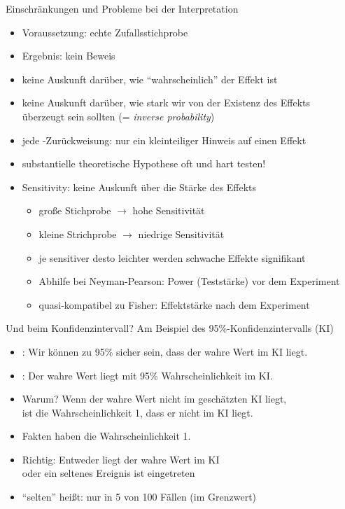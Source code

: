 \begin{frame}
  {Einschränkungen und Probleme bei der Interpretation}
  \begin{itemize}
    \item Voraussetzung: \alert{echte Zufallsstichprobe}
    \item Ergebnis: \alert{kein Beweis}
    \item keine Auskunft darüber, wie "`wahrscheinlich"' der Effekt ist
    \item keine Auskunft darüber, wie stark wir von der Existenz des Effekts\\
      überzeugt sein sollten (= \textit{inverse probability})
    \item jede \Null-Zurückweisung: nur ein kleinteiliger Hinweis auf einen Effekt
    \item \alert{substantielle} theoretische Hypothese oft und hart testen!
      \vspace{\baselineskip}
    \item \alert{Sensitivity}: keine Auskunft über die \alert{Stärke} des Effekts
      \begin{itemize}
        \item große Stichprobe $\rightarrow$ hohe Sensitivität
        \item kleine Strichprobe $\rightarrow$ niedrige Sensitivität
        \item je sensitiver desto leichter werden schwache Effekte signifikant
        \item Abhilfe bei Neyman-Pearson: \alert{Power} (Teststärke) vor dem Experiment
        \item quasi-kompatibel zu Fisher: \alert{Effektstärke} nach dem Experiment
      \end{itemize}
  \end{itemize}
\end{frame}

\begin{frame}
  {Und beim Konfidenzintervall?}
  Am Beispiel des 95\%-Konfidenzintervalls (KI)
  \begin{itemize}
    \item {}: Wir können zu 95\% sicher sein, dass der wahre Wert im KI liegt.
    \item {}: Der wahre Wert liegt mit 95\% Wahrscheinlichkeit im KI.
      \vspace{\baselineskip}
    \item Warum? \alert{Wenn der wahre Wert nicht im geschätzten KI liegt,\\
      ist die Wahrscheinlichkeit 1, dass er nicht im KI liegt.}
    \item Fakten haben die Wahrscheinlichkeit 1.
      \vspace{\baselineskip}
    \item Richtig: Entweder liegt der wahre Wert im KI\\
      \alert{oder ein seltenes Ereignis ist eingetreten}
    \item "`selten"' heißt: nur in 5 von 100 Fällen (im Grenzwert)
  \end{itemize}
\end{frame}



